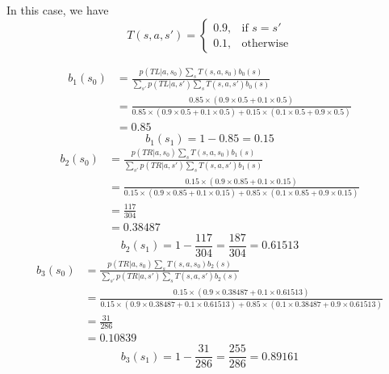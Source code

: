 \subsection{}
In this case, we have
\begin{equation}
    T(s,a,s')=
    \begin{cases}
        0.9, & \text{if } s=s'\\
        0.1, & \text{otherwise}
    \end{cases}
\end{equation}

\begin{equation}
\begin{aligned}
    b_1(s_0)
    &=\frac{p(TL|a,s_0)\sum_s T(s,a,s_0)b_0(s)}
    {\sum_{s'}p(TL|a,s')\sum_s T(s,a,s')b_0(s)}\\
    &=\frac{0.85\times (0.9\times 0.5 + 0.1 \times 0.5)}
    {0.85\times (0.9\times 0.5 + 0.1 \times 0.5)
    + 0.15\times (0.1\times 0.5 + 0.9 \times 0.5)}\\
    &=0.85
\end{aligned}
\end{equation}
\begin{equation}
    b_1(s_1)=1-0.85=0.15
\end{equation}
\begin{equation}
\begin{aligned}
    b_2(s_0)
    &=\frac{p(TR|a,s_0)\sum_s T(s,a,s_0)b_1(s)}
    {\sum_{s'}p(TR|a,s')\sum_s T(s,a,s')b_1(s)}\\
    &=\frac{0.15\times (0.9\times 0.85 + 0.1\times 0.15)}
    {0.15\times (0.9\times 0.85 + 0.1\times 0.15)
    + 0.85\times (0.1\times 0.85 + 0.9\times 0.15)}\\
    &=\frac{117}{304}\\
    &=0.38487
\end{aligned}
\end{equation}
\begin{equation}
    b_2(s_1)=1-\frac{117}{304}=\frac{187}{304}=0.61513
\end{equation}
\begin{equation}
\begin{aligned}
    b_3(s_0)
    &=\frac{p(TR|a,s_0)\sum_s T(s,a,s_0)b_2(s)}
    {\sum_{s'}p(TR|a,s')\sum_s T(s,a,s')b_2(s)}\\
    &=\frac{0.15\times (0.9\times 0.38487 + 0.1\times 0.61513)}
    {0.15\times (0.9\times 0.38487 + 0.1\times 0.61513)
    + 0.85\times (0.1\times 0.38487 + 0.9\times 0.61513)}\\
    &=\frac{31}{286}\\
    &=0.10839
\end{aligned}
\end{equation}
\begin{equation}
    b_3(s_1)=1-\frac{31}{286}=\frac{255}{286}=0.89161
\end{equation}


